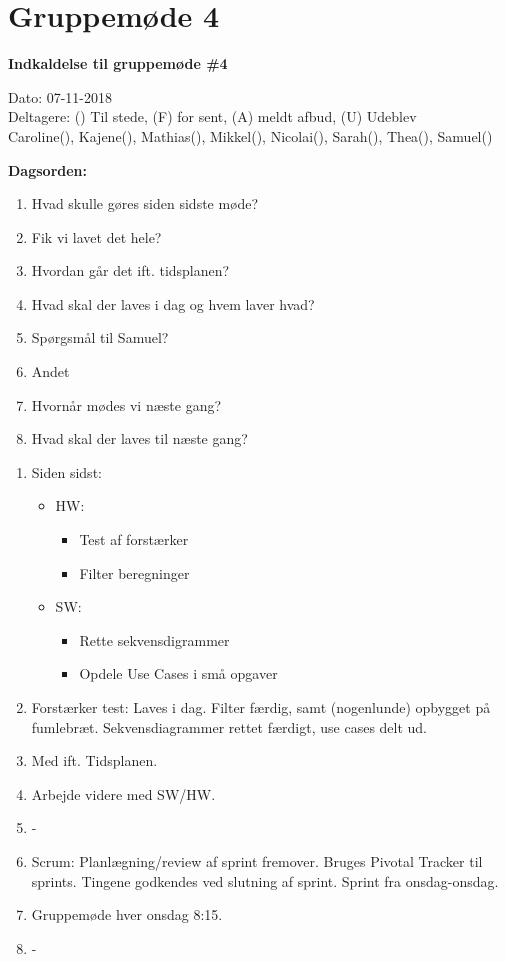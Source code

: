 \section{Gruppemøde 4}

\vspace{0.5 cm}
\textbf{Indkaldelse til gruppemøde \#4}

Dato: 07-11-2018 \\
Deltagere: () Til stede, (F) for sent, (A) meldt afbud, (U) Udeblev \\
Caroline(), Kajene(), Mathias(), Mikkel(), Nicolai(), Sarah(), Thea(), Samuel() 

\vspace{0.1 cm}
\textbf{Dagsorden:}

\begin{enumerate}
	\item Hvad skulle gøres siden sidste møde?
	\item Fik vi lavet det hele?
	\item Hvordan går det ift. tidsplanen?
	\item Hvad skal der laves i dag og hvem laver hvad?
	\item Spørgsmål til Samuel?
	\item Andet
	\item Hvornår mødes vi næste gang?
	\item Hvad skal der laves til næste gang?
\end{enumerate}

\begin{enumerate}
	\item Siden sidst:
	\begin{itemize}
		\item HW:
		\begin{itemize}
			\item Test af forstærker
			\item Filter beregninger
		\end{itemize}
		\item SW:
		\begin{itemize}
			\item Rette sekvensdigrammer
			\item Opdele Use Cases i små opgaver
		\end{itemize}
	\end{itemize}
	\item Forstærker test: Laves i dag. Filter færdig, samt (nogenlunde) opbygget på fumlebræt. Sekvensdiagrammer rettet færdigt, use cases delt ud.
	\item Med ift. Tidsplanen.
	\item Arbejde videre med SW/HW.
	\item -
	\item Scrum: Planlægning/review af sprint fremover. Bruges Pivotal Tracker til sprints. Tingene godkendes ved slutning af sprint. Sprint fra onsdag-onsdag.
	\item Gruppemøde hver onsdag 8:15.
	\item -
\end{enumerate}

\clearpage